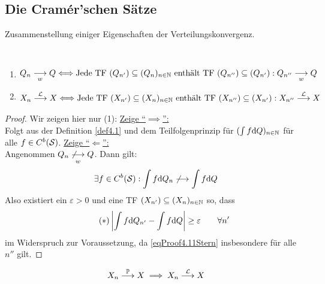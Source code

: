 \subsection{Die Cramér'schen Sätze}
Zusammenstellung einiger Eigenschaften der Verteilungskonvergenz.

\begin{satz}\label{satz4.11}\
	\begin{enumerate}[label=(\arabic*)]
		\item $\begin{aligned}
			Q_n\stackrelnew{w}{}{\longrightarrow} Q
			\Longleftrightarrow
			\text{Jede TF }(Q_{n'})\subseteq(Q_n)_{n\in\N}\text{ enthält TF }(Q_{n''})\subseteq(Q_{n'}):Q_{n''}\stackrelnew{w}{}{\longrightarrow} Q
		\end{aligned}$
		\item $\begin{aligned}
			X_n\stackrel{\L}{\longrightarrow} X\Longleftrightarrow\text{Jede TF }(X_{n'})\subseteq(X_n)_{n\in\N}\text{ enthält TF }(X_{n''})\subseteq(X_{n'}):X_{n''}\stackrel{\L}{\longrightarrow} X
		\end{aligned}$
	\end{enumerate}
\end{satz}

\begin{proof}
	Wir zeigen hier nur (1):\nl
	\underline{Zeige ``$\implies$'':}\\
	Folgt aus der Definition \ref{def4.1} und dem Teilfolgenprinzip für $(\int f\d Q)_{n\in\N}$ für alle $f\in C^b(\S)$.\nl
	\underline{Zeige ``$\Longleftarrow$'':}\\
	Angenommen $Q_n\stackrelnew{w}{}{\not\longrightarrow} Q$. 
	Dann gilt:
	\begin{align*}
		\exists f\in C^b(\S):\int\limits f\d Q_n\not\longrightarrow\int\limits f\d Q
	\end{align*}
	Also existiert ein $\varepsilon>0$ und eine TF $(X_{n'})\subseteq(X_n)_{n\in\N}$ so, dass
	\begin{align}\label{eqProof4.11Stern}\tag{$\ast$}
		\left|\int\limits f\d Q_{n'}-\int\limits f\d Q\right|\geq\varepsilon\qquad\forall n'
	\end{align}
	im Widerspruch zur Voraussetzung, da \eqref{eqProof4.11Stern} insbesondere für alle $n''$ gilt.
\end{proof}

\begin{satz}\label{satz4.12}
	\begin{align*}
		X_n\stackrel{\P}{\longrightarrow} X\implies X_n\stackrel{\L}{\longrightarrow} X
	\end{align*}
\end{satz}

